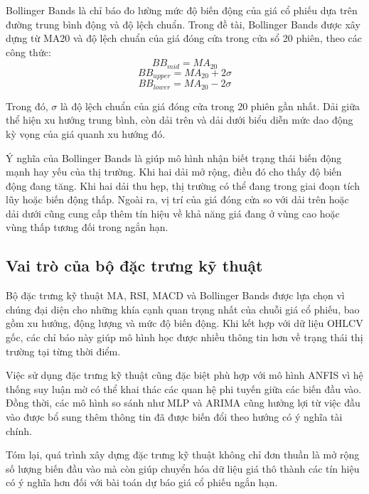 Bollinger Bands là chỉ báo đo lường mức độ biến động của giá cổ phiếu dựa trên đường trung bình động và độ lệch chuẩn. Trong đề tài, Bollinger Bands được xây dựng từ MA20 và độ lệch chuẩn của giá đóng cửa trong cửa sổ 20 phiên, theo các công thức:
\begin{equation}
    BB_{mid} = MA_{20}
\end{equation}
\begin{equation}
    BB_{upper} = MA_{20} + 2\sigma
\end{equation}
\begin{equation}
    BB_{lower} = MA_{20} - 2\sigma
\end{equation}

Trong đó, $\sigma$ là độ lệch chuẩn của giá đóng cửa trong 20 phiên gần nhất. Dải giữa thể hiện xu hướng trung bình, còn dải trên và dải dưới biểu diễn mức dao động kỳ vọng của giá quanh xu hướng đó.

Ý nghĩa của Bollinger Bands là giúp mô hình nhận biết trạng thái biến động mạnh hay yếu của thị trường. Khi hai dải mở rộng, điều đó cho thấy độ biến động đang tăng. Khi hai dải thu hẹp, thị trường có thể đang trong giai đoạn tích lũy hoặc biến động thấp. Ngoài ra, vị trí của giá đóng cửa so với dải trên hoặc dải dưới cũng cung cấp thêm tín hiệu về khả năng giá đang ở vùng cao hoặc vùng thấp tương đối trong ngắn hạn.

\subsection{Vai trò của bộ đặc trưng kỹ thuật}

Bộ đặc trưng kỹ thuật MA, RSI, MACD và Bollinger Bands được lựa chọn vì chúng đại diện cho những khía cạnh quan trọng nhất của chuỗi giá cổ phiếu, bao gồm xu hướng, động lượng và mức độ biến động. Khi kết hợp với dữ liệu OHLCV gốc, các chỉ báo này giúp mô hình học được nhiều thông tin hơn về trạng thái thị trường tại từng thời điểm.

Việc sử dụng đặc trưng kỹ thuật cũng đặc biệt phù hợp với mô hình ANFIS vì hệ thống suy luận mờ có thể khai thác các quan hệ phi tuyến giữa các biến đầu vào. Đồng thời, các mô hình so sánh như MLP và ARIMA cũng hưởng lợi từ việc đầu vào được bổ sung thêm thông tin đã được biến đổi theo hướng có ý nghĩa tài chính.

Tóm lại, quá trình xây dựng đặc trưng kỹ thuật không chỉ đơn thuần là mở rộng số lượng biến đầu vào mà còn giúp chuyển hóa dữ liệu giá thô thành các tín hiệu có ý nghĩa hơn đối với bài toán dự báo giá cổ phiếu ngắn hạn.





